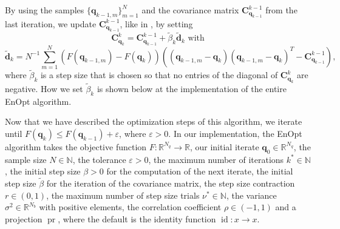 By using the samples $\{\mathbf{q}_{k-1,m}\}_{m=1}^N$ and the covariance matrix $\mathbf{C}_{\mathbf{q}_{k-1}}^{k-1}$ from the last iteration, we update $\mathbf{C}_{\mathbf{q}_{k-1}}^{k-1}$, like in \cite{Stordal2016-cj}, by setting
\begin{displaymath}
\mathbf{C}_{\mathbf{q}_{k}}^{k}=\mathbf{C}_{\mathbf{q}_{k-1}}^{k-1}+\tilde{\beta}_k\tilde{\mathbf{d}}_k\text{ with}
\end{displaymath}
\begin{displaymath}
\tilde{\mathbf{d}}_k=N^{-1}\sum_{m=1}^N(F(\mathbf{q}_{k-1,m})-F(\mathbf{q}_k))((\mathbf{q}_{k-1,m}-\mathbf{q}_k)(\mathbf{q}_{k-1,m}-\mathbf{q}_k)^T-\mathbf{C}_{\mathbf{q}_{k-1}}^{k-1}),
\end{displaymath}
where $\tilde{\beta}_k$ is a step size that is chosen so that no entries of the diagonal of $\mathbf{C}_{\mathbf{q}_{k}}^{k}$ are negative. How we set $\tilde{\beta}_k$ is shown below at the implementation of the entire EnOpt algorithm.

Now that we have described the optimization steps of this algorithm, we iterate until $F(\mathbf{q}_k)\leq F(\mathbf{q}_{k-1})+\varepsilon$, where $\varepsilon>0$. In our implementation, the EnOpt algorithm takes the objective function $F:\mathbb{R}^{N_q}\to\mathbb{R}$, our initial iterate $\mathbf{q}_0\in\mathbb{R}^{N_q}$, the sample size $N\in\mathbb{N}$, the tolerance $\varepsilon>0$, the maximum number of iterations $k^*\in\mathbb{N}$, the initial step size $\beta>0$ for the computation of the next iterate, the initial step size $\tilde{\beta}$ for the iteration of the covariance matrix, the step size contraction $r\in(0,1)$, the maximum number of step size trials $\nu^*\in\mathbb{N}$, the variance $\sigma^2\in\mathbb{R}^{N_b}$ with positive elements, the correlation coefficient $\rho\in(-1,1)$ and a projection $\operatorname{pr}$, where the default is the identity function $\operatorname{id}:x\to x$.

